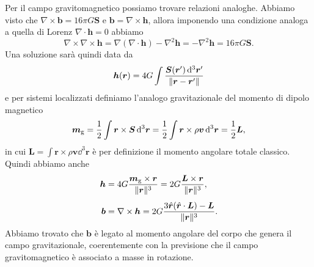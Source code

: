 Per il campo gravitomagnetico possiamo trovare relazioni analoghe.  Abbiamo
visto che $\nabla \times \bm{b} = 16 \pi G \bm{S}$ e
$\bm{b} = \nabla \times \bm{h}$, allora imponendo una condizione analoga a
quella di Lorenz $\nabla \cdot \bm{h} = 0$ abbiamo
\begin{equation}
  \nabla \times \nabla \times \bm{h} = \nabla (\nabla \cdot \bm{h}) - \nabla^{2}
  \bm{h} = - \nabla^{2} \bm{h} = 16\pi G \bm{S}.
\end{equation}
Una soluzione sarà quindi data da
\begin{equation}
  \bm{h}(\bm{r}) = 4 G \int \frac{\bm{S}(\bm{r}') \mathop{}\!\mathrm{d}^{3} \bm{r}'}{\lVert\bm{r}
      - \bm{r}'\rVert}
\end{equation}
e per sistemi localizzati definiamo l'analogo gravitazionale del momento di
dipolo magnetico
\begin{equation}
  \bm{m}_{\textup{g}} = \frac{1}{2} \int \bm{r} \times \bm{S} \mathop{}\!\mathrm{d}^{3} \bm{r} =
  \frac{1}{2} \int \bm{r} \times \rho \bm{v} \mathop{}\!\mathrm{d}^{3} \bm{r} = \frac{1}{2} \bm{L},
\end{equation}
in cui $\bm{L} = \int \bm{r} \times \rho \bm{v} \dd^{3} \bm{r}$ è per
definizione il momento angolare totale classico.  Quindi abbiamo anche
\begin{subequations}
  \begin{align}
    \bm{h} &= 4G \frac{\bm{m}_{\textup{g}} \times \bm{r}}{\lVert\bm{r}\rVert^{3}} =
    2G \frac{\bm{L} \times \bm{r}}{\lVert\bm{r}\rVert^{3}}, \\[1ex]
    \bm{b} &= \nabla \times \bm{h} = 2G\frac{3\hat{\bm{r}}(\hat{\bm{r}} \cdot
      \bm{L}) - \bm{L}}{\lVert\bm{r}\rVert^{3}}.
  \end{align}
\end{subequations}
Abbiamo trovato che $\bm{b}$ è legato al momento angolare del corpo che genera
il campo gravitazionale, coerentemente con la previsione che il campo
gravitomagnetico è associato a masse in rotazione.

